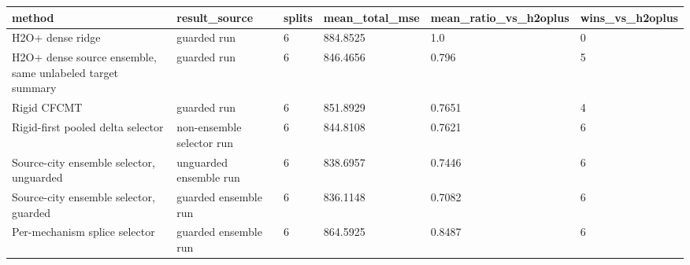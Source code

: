 \begin{tabular}{llllll}
\toprule
method & result\_source & splits & mean\_total\_mse & mean\_ratio\_vs\_h2oplus & wins\_vs\_h2oplus \\
\midrule
H2O+ dense ridge & guarded run & 6 & 884.8525 & 1.0 & 0 \\
H2O+ dense source ensemble, same unlabeled target summary & guarded run & 6 & 846.4656 & 0.796 & 5 \\
Rigid CFCMT & guarded run & 6 & 851.8929 & 0.7651 & 4 \\
Rigid-first pooled delta selector & non-ensemble selector run & 6 & 844.8108 & 0.7621 & 6 \\
Source-city ensemble selector, unguarded & unguarded ensemble run & 6 & 838.6957 & 0.7446 & 6 \\
Source-city ensemble selector, guarded & guarded ensemble run & 6 & 836.1148 & 0.7082 & 6 \\
Per-mechanism splice selector & guarded ensemble run & 6 & 864.5925 & 0.8487 & 6 \\
\bottomrule
\end{tabular}
